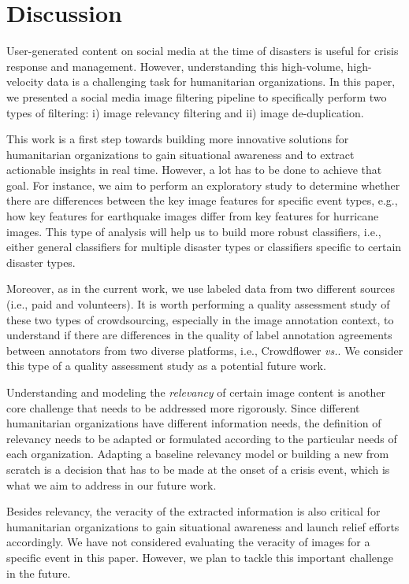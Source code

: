 \documentclass{iscram}
\begin{document}
\section{Discussion}
User-generated content on social media at the time of disasters is useful for crisis response and management. However, understanding this high-volume, high-velocity data is a challenging task for humanitarian organizations. In this paper, we presented a social media image filtering pipeline to specifically perform two types of filtering: i) image relevancy filtering and ii) image de-duplication.

This work is a first step towards building more innovative solutions for humanitarian organizations to gain situational awareness and to extract actionable insights in real time. However, a lot has to be done to achieve that goal. For instance, we aim to perform an exploratory study to determine whether there are differences between the key image features for specific event types, e.g., how key features for earthquake images differ from key features for hurricane images. This type of analysis will help us to build more robust classifiers, i.e., either general classifiers for multiple disaster types or classifiers specific to certain disaster types.

Moreover, as in the current work, we use labeled data from two different sources (i.e., paid and volunteers). It is worth performing a quality assessment study of these two types of crowdsourcing, especially in the image annotation context, to understand if there are differences in the quality of label annotation agreements between annotators from two diverse platforms, i.e., Crowdflower \textit{vs.}\AIDR. We consider this type of a quality assessment study as a potential future work.

Understanding and modeling the \emph{relevancy} of certain image content is another core challenge that needs to be addressed more rigorously. Since different humanitarian organizations have different information needs, the definition of relevancy needs to be adapted or formulated according to the particular needs of each organization. Adapting a baseline relevancy model or building a new from scratch is a decision that has to be made at the onset of a crisis event, which is what we aim to address in our future work. 

Besides relevancy, the veracity of the extracted information is also critical for humanitarian organizations to gain situational awareness and launch relief efforts accordingly. We have not considered evaluating the veracity of images for a specific event in this paper. However, we plan to tackle this important challenge in the future.
\end{document}
